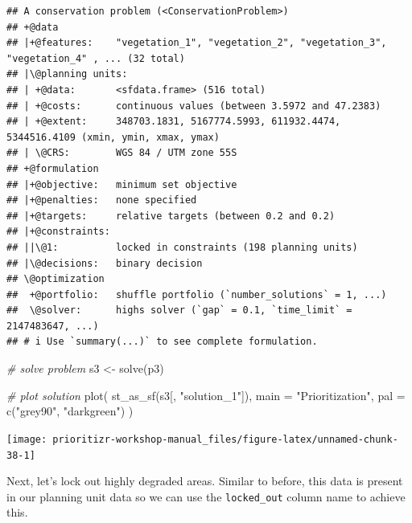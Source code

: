 \documentclass[
  12pt,
]{book}
\newenvironment{Shaded}{\begin{snugshade}}{\end{snugshade}}
\newcommand{\AttributeTok}[1]{\textcolor[rgb]{0.77,0.63,0.00}{#1}}
\newcommand{\CommentTok}[1]{\textcolor[rgb]{0.56,0.35,0.01}{\textit{#1}}}
\newcommand{\FunctionTok}[1]{\textcolor[rgb]{0.00,0.00,0.00}{#1}}
\newcommand{\NormalTok}[1]{#1}
\newcommand{\OtherTok}[1]{\textcolor[rgb]{0.56,0.35,0.01}{#1}}
\newcommand{\StringTok}[1]{\textcolor[rgb]{0.31,0.60,0.02}{#1}}
\begin{document}
\begin{verbatim}
## A conservation problem (<ConservationProblem>)
## +@data
## |+@features:    "vegetation_1", "vegetation_2", "vegetation_3", "vegetation_4" , ... (32 total)
## |\@planning units:
## | +@data:       <sfdata.frame> (516 total)
## | +@costs:      continuous values (between 3.5972 and 47.2383)
## | +@extent:     348703.1831, 5167774.5993, 611932.4474, 5344516.4109 (xmin, ymin, xmax, ymax)
## | \@CRS:        WGS 84 / UTM zone 55S
## +@formulation
## |+@objective:   minimum set objective
## |+@penalties:   none specified
## |+@targets:     relative targets (between 0.2 and 0.2)
## |+@constraints:
## ||\@1:          locked in constraints (198 planning units)
## |\@decisions:   binary decision
## \@optimization
##  +@portfolio:   shuffle portfolio (`number_solutions` = 1, ...)
##  \@solver:      highs solver (`gap` = 0.1, `time_limit` = 2147483647, ...)
## # i Use `summary(...)` to see complete formulation.
\end{verbatim}

\begin{Shaded}
\begin{Highlighting}[]
\CommentTok{\# solve problem}
\NormalTok{s3 }\OtherTok{\textless{}{-}} \FunctionTok{solve}\NormalTok{(p3)}

\CommentTok{\# plot solution}
\FunctionTok{plot}\NormalTok{(}
  \FunctionTok{st\_as\_sf}\NormalTok{(s3[, }\StringTok{"solution\_1"}\NormalTok{]), }\AttributeTok{main =} \StringTok{"Prioritization"}\NormalTok{,}
  \AttributeTok{pal =} \FunctionTok{c}\NormalTok{(}\StringTok{"grey90"}\NormalTok{, }\StringTok{"darkgreen"}\NormalTok{)}
\NormalTok{)}
\end{Highlighting}
\end{Shaded}

\begin{center}\texttt{[image: prioritizr-workshop-manual\_files/figure-latex/unnamed-chunk-38-1]} \end{center}

Next, let's lock out highly degraded areas. Similar to before, this data is present in our planning unit data so we can use the \texttt{locked\_out} column name to achieve this.
\end{document}
